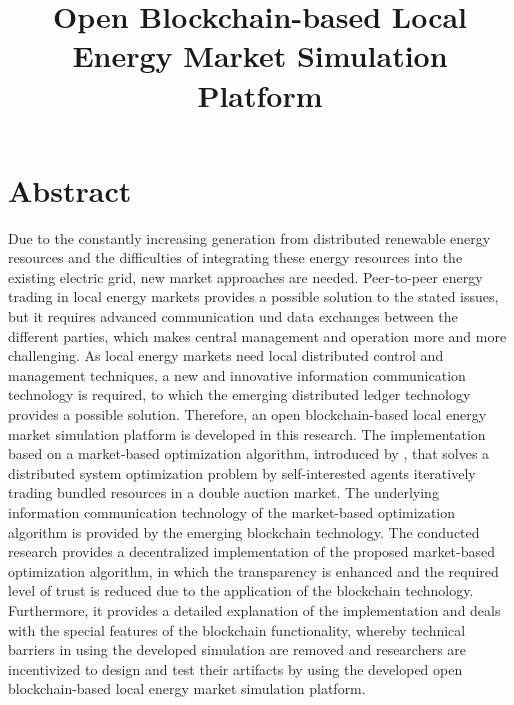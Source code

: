 \documentclass[a4paper, 12pt]{article}
\title{Open Blockchain-based Local Energy Market Simulation Platform}
\begin{document}




\clearpage
\thispagestyle{empty}

\section*{Abstract}

Due to the constantly increasing generation from distributed renewable energy resources and the 
difficulties of integrating these energy resources into the existing electric grid, new market approaches
are needed. 
Peer-to-peer energy trading in local energy markets provides a possible solution to the stated issues,
but it requires advanced communication und data exchanges between the different parties, which makes 
central management and operation more and more challenging.
As local energy markets need local distributed control and management techniques, a new and innovative 
information communication technology is required, to which the emerging distributed ledger technology
provides a possible solution.
Therefore, an open blockchain-based local energy market simulation platform is developed in this research.
The implementation
based on a market-based optimization algorithm, introduced by , that solves a 
distributed system optimization problem by self-interested agents iteratively trading bundled resources in a double auction market.
The underlying information communication technology of the market-based optimization algorithm 
is provided by the emerging blockchain technology.
The conducted research provides a decentralized implementation of the proposed market-based optimization algorithm, 
in which the transparency is enhanced and the required level of trust is reduced due to the application of 
the blockchain technology. Furthermore, it provides a detailed explanation of the implementation and deals with 
the special features of the blockchain functionality, whereby technical barriers in using the developed simulation are 
removed and researchers are incentivized to design and test their artifacts by using the developed open blockchain-based 
local energy market simulation platform.
 
\end{document}

